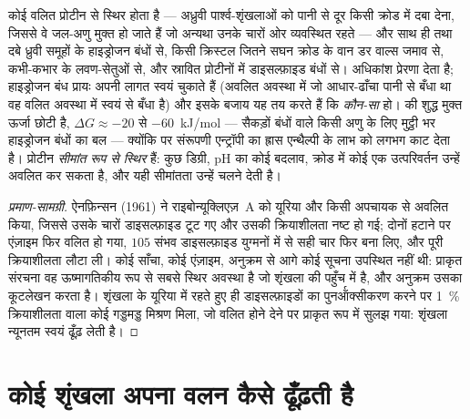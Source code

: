 \begin{proposition}\label{prop:b3:structural-biology:forces}
कोई वलित प्रोटीन \emph{} से स्थिर होता है ---
अध्रुवी पार्श्व-शृंखलाओं को पानी से दूर किसी क्रोड में दबा देना, जिससे
वे जल-अणु मुक्त हो जाते हैं जो अन्यथा उनके चारों ओर व्यवस्थित रहते ---
और साथ ही  तथा दबे ध्रुवी समूहों के हाइड्रोजन बंधों से,
किसी क्रिस्टल जितने सघन क्रोड के वान डर वाल्स जमाव से, कभी-कभार के
लवण-सेतुओं से, और स्रावित प्रोटीनों में डाइसल्फ़ाइड बंधों से।
अधिकांश प्रेरणा  देता है; हाइड्रोजन बंध प्रायः अपनी लागत
स्वयं चुकाते हैं (अवलित अवस्था में जो आधार-ढाँचा पानी से बँधा था वह
वलित अवस्था में स्वयं से बँधा है) और इसके बजाय यह तय करते हैं कि 
\emph{कौन-सा} हो।  की शुद्ध मुक्त ऊर्जा छोटी है,
$\Delta G \approx -20$ से \qty{-60}{kJ/mol} --- सैकड़ों बंधों वाले किसी
अणु के लिए मुट्ठी भर हाइड्रोजन बंधों का बल --- क्योंकि  पर संरूपणी
एन्ट्रॉपी का ह्रास एन्थैल्पी के लाभ को लगभग काट देता है। प्रोटीन
\emph{सीमांत रूप से स्थिर} हैं: कुछ डिग्री, pH का कोई बदलाव, क्रोड में
कोई एक उत्परिवर्तन उन्हें अवलित कर सकता है, और यही सीमांतता उन्हें चलने
देती है।
\end{proposition}

\begin{proof}[प्रमाण-सामग्री]
ऐनफ़िन्सन (1961) ने राइबोन्यूक्लिएज़~A को यूरिया और किसी अपचायक से
अवलित किया, जिससे उसके चारों डाइसल्फ़ाइड टूट गए और उसकी क्रियाशीलता
नष्ट हो गई; दोनों हटाने पर एंज़ाइम फिर वलित हो गया, $105$ संभव
डाइसल्फ़ाइड युग्मनों में से सही चार फिर बना लिए, और पूरी क्रियाशीलता
लौटा ली। कोई साँचा, कोई एंज़ाइम, अनुक्रम से आगे कोई सूचना उपस्थित नहीं
थी: प्राकृत संरचना वह ऊष्मागतिकीय रूप से सबसे स्थिर अवस्था है जो
शृंखला की पहुँच में है, और अनुक्रम उसका कूटलेखन करता है। शृंखला के
यूरिया में रहते हुए ही डाइसल्फ़ाइडों का पुनर्ऑक्सीकरण करने पर
\qty{1}{\%} क्रियाशीलता वाला कोई गड्डमड्ड मिश्रण मिला, जो वलित होने
देने पर प्राकृत रूप में सुलझ गया: शृंखला न्यूनतम स्वयं ढूँढ़ लेती है।
\end{proof}

\section{कोई शृंखला अपना वलन कैसे ढूँढ़ती है}

